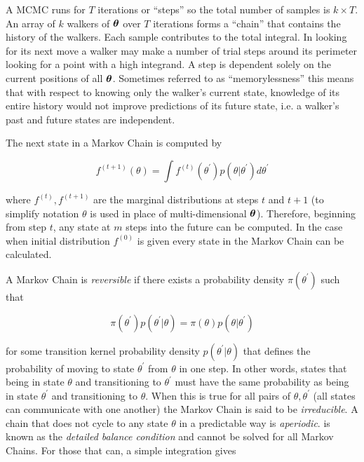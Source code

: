 A MCMC runs for $T$ iterations or ``steps'' so the total number of samples is $k \times T$.    An array of $k$ walkers of
$\boldsymbol{\theta}$ over $T$ iterations forms a ``chain'' that contains the history of the walkers.  Each sample contributes
to the total integral.  In looking for its next move a walker may make a number of trial steps around its perimeter looking for
a point with a high integrand.  A step is dependent solely on the current positions of all $\boldsymbol{\theta}$.  Sometimes referred to as
``memorylessness'' this means that with respect to knowing only the walker's current state, knowledge of its entire history would not
improve predictions of its future state, i.e. a walker's past and future states are independent.

The next state in a Markov Chain is computed by

\vspace{-10pt}

\begin{equation}
f^{(t + 1)} (\theta) = \int f^{(t)} (\theta^{\prime}) p(\theta|\theta^{\prime}) d\theta^{\prime}
\label{eq:er_nr_calibrations_parameter_determ_mcmc_marginal}
\end{equation}

\noindent where $f^{(t)}, f^{(t + 1)}$ are the marginal distributions at steps $t$ and $t + 1$ (to simplify notation $\theta$
is used in place of multi-dimensional $\boldsymbol{\theta}$).  Therefore, beginning from step $t$, any state
at $m$ steps into the future can be computed.  In the case when initial distribution $f^{(0)}$ is given every state in the Markov Chain
can be calculated.

A Markov Chain is \textit{reversible} if there exists a probability density $\pi (\theta^{\prime})$ such that

\vspace{-10pt}

\begin{equation}
\pi (\theta^{\prime}) p(\theta^{\prime}|\theta) = \pi (\theta) p(\theta|\theta^{\prime})
\label{eq:er_nr_calibrations_parameter_determ_mcmc_detailed_balance}
\end{equation}

\noindent for some transition kernel probability density $p(\theta^{\prime}|\theta)$ that defines the probability of
moving to state $\theta^{\prime}$ from $\theta$ in one step.  In other words, 
 states that being in state $\theta$ and transitioning to
$\theta^{\prime}$ must have the same probability as being in state $\theta^{\prime}$ and transitioning to  $\theta$.  When
this is true for all pairs of $\theta, \theta^{\prime}$ (all states can communicate with one another) the Markov Chain
is said to be \textit{irreducible}.  A chain that does not cycle to any state $\theta$ in a predictable way is
\textit{aperiodic}.  
is known as the \textit{detailed balance condition} and cannot be solved for all Markov Chains.  For those that can, a simple integration
gives

